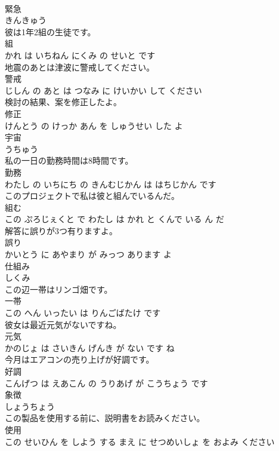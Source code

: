 \documentclass[8pt]{extreport}
\begin{document}
\begin{CJK}{UTF8}{min}
\\	緊急	
\\	きんきゅう		
\\	彼は1年2組の生徒です。	
\\	組 
\\	かれ は いちねん にくみ の せいと です		
\\	地震のあとは津波に警戒してください。	
\\	警戒 
\\	じしん の あと は つなみ に けいかい して ください		
\\	検討の結果、案を修正したよ。	
\\	修正 
\\	けんとう の けっか あん を しゅうせい した よ		
\\	宇宙	
\\	うちゅう		
\\	私の一日の勤務時間は8時間です。	
\\	勤務 
\\	わたし の いちにち の きんむじかん は はちじかん です		
\\	このプロジェクトで私は彼と組んでいるんだ。	
\\	組む 
\\	この ぷろじぇくと で わたし は かれ と くんで いる ん だ		
\\	解答に誤りが3つ有りますよ。	
\\	誤り 
\\	かいとう に あやまり が みっつ あります よ		
\\	仕組み	
\\	しくみ		
\\	この辺一帯はリンゴ畑です。	
\\	一帯 
\\	この へん いったい は りんごばたけ です		
\\	彼女は最近元気がないですね。	
\\	元気 
\\	かのじょ は さいきん げんき が ない です ね		
\\	今月はエアコンの売り上げが好調です。	
\\	好調 
\\	こんげつ は えあこん の うりあげ が こうちょう です		
\\	象徴	
\\	しょうちょう		
\\	この製品を使用する前に、説明書をお読みください。	
\\	使用 
\\	この せいひん を しよう する まえ に せつめいしょ を およみ ください		

\end{CJK}
\end{document}
